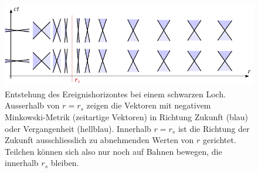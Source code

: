 %
%
%
\begin{figure}
\centering
\includegraphics{chapters/110-kruemmung/images/sl.pdf}
\caption{Entstehung des Ereignishorizontes bei einem schwarzen Loch.
Ausserhalb von $r=r_s$ zeigen
die Vektoren mit negativem Minkowski-Metrik (zeitartige Vektoren)
in Richtung Zukunft (blau) oder Vergangenheit (hellblau).
Innerhalb $r=r_s$ ist die Richtung der Zukunft ausschliesslich zu
abnehmenden Werten von $r$ gerichtet.
Teilchen können sich also nur noch auf Bahnen bewegen, die innerhalb
$r_s$ bleiben.
\label{buch:kruemmung:schwarzesloch:fig:sl}}
\end{figure}

